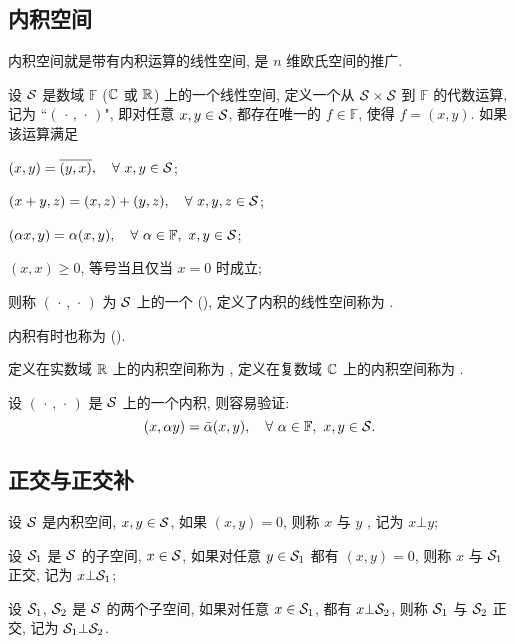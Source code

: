 \subsection{内积空间}
内积空间就是带有内积运算的线性空间, 是 $n$ 维欧氏空间的推广.
\begin{definition}[内积空间]
	设 $\mathcal{S}$ 是数域 $\mathbb{F}$ ($\mathbb{C}$ 或 $\mathbb{R}$) 上的一个线性空间,
	定义一个从 $\mathcal{S}\times\mathcal{S}$ 到 $\mathbb{F}$ 的代数运算,
	记为 ``$(\,\cdot\, ,\,\cdot\,)$", 即对任意 $x,y\in\mathcal{S}$,
	都存在唯一的 $f\in\mathbb{F}$, 使得 $f=(x,y)$.
	如果该运算满足
	\begin{nlist}
		\item $(x,y) = \overline{(y,x)},\quad
		\forall\ x,y\in\mathcal{S} $;
		\item $(x+y,z) = (x,z) +(y,z),\quad
		\forall\ x,y,z\in\mathcal{S} $;
		\item $(\alpha x,y)=\alpha (x,y),\quad
		\forall\ \alpha\in\mathbb{F},\ x,y\in\mathcal{S} $;
		\item $(x,x)\geq 0$, 等号当且仅当 $x=0$ 时成立;
	\end{nlist}
	则称 $(\,\cdot\, ,\,\cdot\,)$ 为 $\mathcal{S}$ 上的一个 
	(), 定义了内积的线性空间称为 .
\end{definition}

\medskip
\begin{note}
	内积有时也称为  ().
\end{note}

\begin{note}
	定义在实数域 $\mathbb{R}$ 上的内积空间称为 ,
	定义在复数域 $\mathbb{C}$ 上的内积空间称为 .
\end{note}

\begin{example}
	设 $(\,\cdot\, ,\,\cdot\,)$ 是 $\mathcal{S}$ 上的一个内积, 则容易验证:
	$$ (x,\alpha y)=\bar\alpha (x,y),\quad
	\forall\ \alpha\in\mathbb{F},\ x,y\in\mathcal{S}.
	$$
\end{example}


\subsection{正交与正交补}
\begin{definition}[正交]
	设 $\mathcal{S}$ 是内积空间, $x,y\in\mathcal{S}$, 如果 $(x,y)=0$,
	则称 $x$ 与 $y$ , 记为 $x\bot y$;
	
	设 $\mathcal{S}_1$ 是 $\mathcal{S}$ 的子空间, $x\in\mathcal{S}$, 如果对任意 $y\in\mathcal{S}_1$ 都有
	$ (x,y)=0$, 则称 $x$ 与 $\mathcal{S}_1$ 正交, 记为 $x\bot\mathcal{S}_1$;
	
	设 $\mathcal{S}_1$, $\mathcal{S}_2$ 是 $\mathcal{S}$ 的两个子空间,
	如果对任意 $x\in\mathcal{S}_1$, 都有 $x\bot\mathcal{S}_2$,
	则称 $\mathcal{S}_1$ 与 $\mathcal{S}_2$ 正交, 记为 $\mathcal{S}_1\bot\mathcal{S}_2$.
\end{definition}

